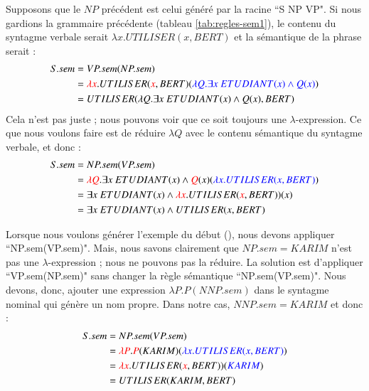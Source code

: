 \documentclass{KodeBook}
\begin{document}
Supposons que le $NP$ précédent est celui généré par la racine ``S \textrightarrow NP VP". 
Si nous gardions la grammaire précédente (tableau \ref{tab:regles-sem1}), le contenu du syntagme verbale serait $\lambda x.UTILISER(x, BERT)$ et la sémantique de la phrase serait :
\begin{align*}
S.sem & = VP.sem(NP.sem) \\
& = \textcolor{red}{\lambda x}.UTILISER(\textcolor{red}{x}, BERT)(\textcolor{blue}{\lambda Q.\exists x\ ETUDIANT(x) \wedge Q(x)})\\
& = UTILISER(\lambda Q.\exists x\ ETUDIANT(x) \wedge Q(x), BERT)
\end{align*}
Cela n'est pas juste ; nous pouvons voir que ce soit toujours une $\lambda $-expression. 
Ce que nous voulons faire est de réduire $\lambda Q$ avec le contenu sémantique du syntagme verbale, et donc :
\begin{align*}
S.sem & = NP.sem(VP.sem) \\
& = \textcolor{red}{\lambda Q}.\exists x\ ETUDIANT(x) \wedge \textcolor{red}{Q}(x)(\textcolor{blue}{\lambda x.UTILISER(x, BERT)})\\
& = \exists x\ ETUDIANT(x) \wedge \textcolor{red}{\lambda x}.UTILISER(\textcolor{red}{x}, BERT))(x) \\
& = \exists x\ ETUDIANT(x) \wedge UTILISER(x, BERT)
\end{align*}

Lorsque nous voulons générer l'exemple du début (), nous devons appliquer ``NP.sem(VP.sem)". 
Mais, nous savons clairement que $NP.sem = KARIM$ n'est pas une $\lambda $-expression ; nous ne pouvons pas la réduire. 
La solution est d'appliquer ``VP.sem(NP.sem)" sans changer la règle sémantique ``NP.sem(VP.sem)". 
Nous devons, donc, ajouter une expression $\lambda P.P(NNP.sem)$ dans le syntagme nominal qui génère un nom propre. 
Dans notre cas, $NNP.sem = KARIM$ et donc :
\begin{align*}
S.sem & = NP.sem(VP.sem) \\
& = \textcolor{red}{\lambda P}.\textcolor{red}{P}(KARIM)(\textcolor{blue}{\lambda x.UTILISER(x, BERT)})\\
& = \textcolor{red}{\lambda x}.UTILISER(\textcolor{red}{x}, BERT))(\textcolor{blue}{KARIM}) \\
& = UTILISER(KARIM, BERT)
\end{align*}
\end{document}
